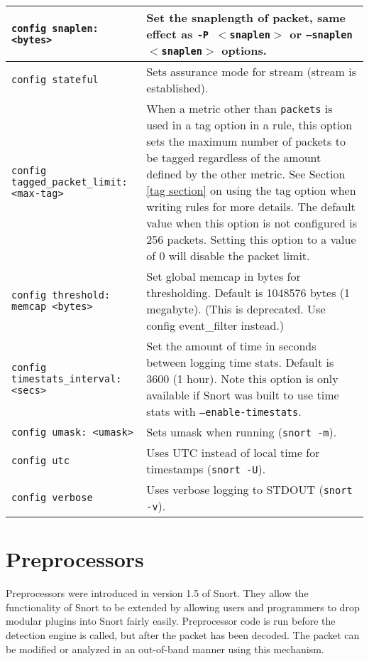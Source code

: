 \documentclass[english]{report}
\begin{document}
\begin{center}
\begin{longtable}[t]{| p{2.5in} | p{3.5in} |}
\hline
\texttt{config snaplen: <bytes>} & Set the snaplength of packet, same effect as
\texttt{-P $<$snaplen$>$} or \texttt{--snaplen $<$snaplen$>$} options.\\

\hline
\texttt{config stateful} & Sets assurance mode for stream (stream is
established). \\

\hline
\texttt{config tagged\_packet\_limit: <max-tag>} & When a metric other than
\texttt{packets} is used in a tag option in a rule, this option sets the
maximum number of packets to be tagged regardless of the amount defined by the
other metric.  See Section \ref{tag section} on using the tag option when
writing rules for more details.  The default value when this option is not
configured is 256 packets.  Setting this option to a value of 0 will disable
the packet limit. \\

\hline
\texttt{config threshold: memcap <bytes>} & Set global memcap in bytes for
thresholding. Default is 1048576 bytes (1 megabyte). (This is deprecated.
Use config event\_filter instead.)\\

\hline
\texttt{config timestats\_interval: <secs>} &

Set the amount of time in seconds between logging time stats.  Default is 3600
(1 hour).  Note this option is only available if Snort was built to use time
stats with \texttt{--enable-timestats}. \\


\hline
\texttt{config umask: <umask>} & Sets umask when running (\texttt{snort -m}). \\

\hline
\texttt{config utc} & Uses UTC instead of local time for timestamps
(\texttt{snort -U}). \\

\hline
\texttt{config verbose} & Uses verbose logging to STDOUT (\texttt{snort -v}).
\\

\hline
\end{longtable}
\end{center}

\section{Preprocessors}

Preprocessors were introduced in version 1.5 of Snort. They allow the
functionality of Snort to be extended by allowing users and programmers to drop
modular plugins into Snort fairly easily.  Preprocessor code is run before the
detection engine is called, but after the packet has been decoded. The packet
can be modified or analyzed in an out-of-band manner using this mechanism.
\end{document}
